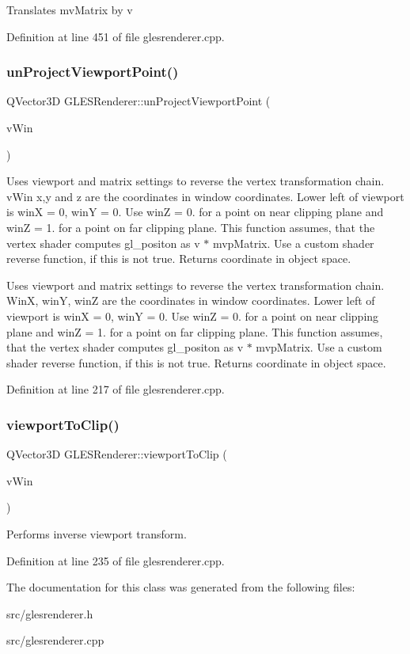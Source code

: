 Translates mv\+Matrix by v 

Definition at line 451 of file glesrenderer.\+cpp.

\mbox{\label{class_g_l_e_s_renderer_a8be3d2a634d0fe1e13fb7b97673eefab}} 
\subsubsection{\texorpdfstring{unProjectViewportPoint()}{unProjectViewportPoint()}}
{\footnotesize\ttfamily Q\+Vector3D G\+L\+E\+S\+Renderer\+::un\+Project\+Viewport\+Point (\begin{DoxyParamCaption}\item[{const Q\+Vector3D \&}]{v\+Win }\end{DoxyParamCaption})}

Uses viewport and matrix settings to reverse the vertex transformation chain. v\+Win x,y and z are the coordinates in window coordinates. Lower left of viewport is winX = 0, winY = 0. Use winZ = 0. for a point on near clipping plane and winZ = 1. for a point on far clipping plane. This function assumes, that the vertex shader computes gl\+\_\+positon as v $\ast$ mvp\+Matrix. Use a custom shader reverse function, if this is not true. Returns coordinate in object space.

Uses viewport and matrix settings to reverse the vertex transformation chain. WinX, winY, winZ are the coordinates in window coordinates. Lower left of viewport is winX = 0, winY = 0. Use winZ = 0. for a point on near clipping plane and winZ = 1. for a point on far clipping plane. This function assumes, that the vertex shader computes gl\+\_\+positon as v $\ast$ mvp\+Matrix. Use a custom shader reverse function, if this is not true. Returns coordinate in object space. 

Definition at line 217 of file glesrenderer.\+cpp.

\mbox{\label{class_g_l_e_s_renderer_a36440b34ef23691928cb033a55c9c6f9}} 
\subsubsection{\texorpdfstring{viewportToClip()}{viewportToClip()}}
{\footnotesize\ttfamily Q\+Vector3D G\+L\+E\+S\+Renderer\+::viewport\+To\+Clip (\begin{DoxyParamCaption}\item[{const Q\+Vector3D \&}]{v\+Win }\end{DoxyParamCaption})}

Performs inverse viewport transform. 

Definition at line 235 of file glesrenderer.\+cpp.



The documentation for this class was generated from the following files\+:\begin{DoxyCompactItemize}
\item 
src/glesrenderer.\+h\item 
src/glesrenderer.\+cpp\end{DoxyCompactItemize}
